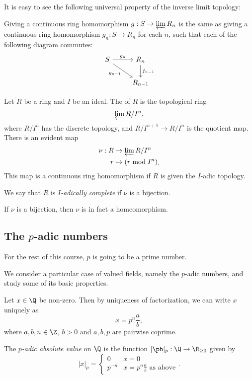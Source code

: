 \documentclass[a4paper]{article}
\begin{document}
It is easy to see the following universal property of the inverse limit topology:
\begin{prop}
  Giving a continuous ring homomorphism $g: S \to \varprojlim R_n$ is the same as giving a continuous ring homomorphism $g_n: S \to R_n$ for each $n$, such that each of the following diagram commutes:
  \[
    \begin{tikzcd}
      S \ar[r, "g_n"] \ar[rd, "g_{n - 1}"'] & R_n \ar[d, "f_{n - 1}"]\\
      & R_{n - 1}
    \end{tikzcd}
  \]
\end{prop}
\begin{defi}
  Let $R$ be a ring and $I$ be an ideal. The  of $R$ is the topological ring
  \[
    \varprojlim R/I^n,
  \]
  where $R/I^n$ has the discrete topology, and $R/I^{n + 1} \to R/I^n$ is the quotient map. There is an evident map
  \begin{align*}
    \nu: R &\to \varprojlim R/I^n\\
    r &\mapsto (r \bmod I^n)_.
  \end{align*}
  This map is a continuous ring homomorphism if $R$ is given the $I$-adic topology.
\end{defi}

\begin{defi}
  We say that $R$ is \emph{$I$-adically complete} if $\nu$ is a bijection.
\end{defi}

\begin{ex}
  If $\nu$ is a bijection, then $\nu$ is in fact a homeomorphism.
\end{ex}

\subsection{The $p$-adic numbers}
For the rest of this course, $p$ is going to be a prime number.

We consider a particular case of valued fields, namely the $p$-adic numbers, and study some of its basic properties.

Let $x \in \Q$ be non-zero. Then by uniqueness of factorization, we can write $x$ uniquely as
\[
  x =p^n \frac{a}{b},
\]
where $a, b, n \in \Z$, $b > 0$ and $a, b, p$ are pairwise coprime.

\begin{defi}
  The \emph{$p$-adic absolute value} on $\Q$ is the function $|\ph|_p: \Q \to \R_{\geq 0}$ given by
  \[
    |x|_p =
    \begin{cases}
      0 & x = 0\\
      p^{-n} & x = p^n \frac{a}{b}\text{ as above}
    \end{cases}.
  \]
\end{defi}
\end{document}
